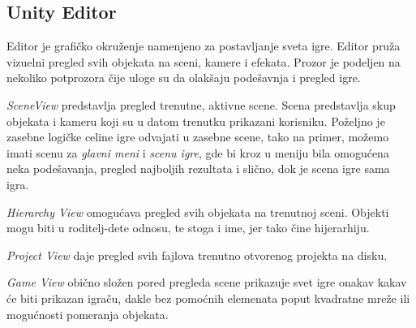 \subsection{Unity Editor}

Editor je grafi\v{c}ko okru\v{z}enje namenjeno za postavljanje sveta igre. Editor
pru\v{z}a vizuelni pregled svih objekata na sceni, kamere i efekata. Prozor je podeljen
na nekoliko potprozora \v{c}ije uloge su da olak\v{s}aju pode\v{s}avnja i pregled igre.

\emph{SceneView} predstavlja pregled trenutne, aktivne scene. Scena predstavlja skup
objekata i kameru koji su u datom trenutku prikazani korisniku. Po\v{z}eljno je zasebne
logi\v{c}ke celine igre odvajati u zasebne scene, tako na primer, mo\v{z}emo imati scenu
za \emph{glavni meni} i \emph{scenu igre}, gde bi kroz u meniju bila omogu\'cena neka pode\v{s}avanja,
pregled najboljih rezultata i sli\v{c}no, dok je scena igre sama igra.

\emph{Hierarchy View} omogu\'cava pregled svih objekata na trenutnoj sceni. Objekti mogu
biti u roditelj-dete odnosu, te stoga i ime, jer tako \v{c}ine hijerarhiju.

\emph{Project View} daje pregled svih fajlova trenutno otvorenog projekta na disku.

\emph{Game View} obi\v{c}no slo\v{z}en pored pregleda scene prikazuje svet igre
onakav kakav \'ce biti prikazan igra\v{c}u, dakle bez pomo\'cnih elemenata poput 
kvadratne mre\v{z}e ili mogu\'cnosti pomeranja objekata. \color{red}{** TODO ubaciti sliku editora **.}






